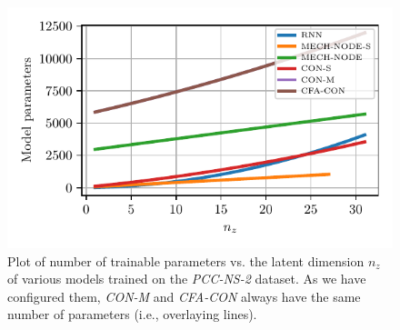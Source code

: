 \begin{figure}
    \centering
    \includegraphics[width=0.6\columnwidth]{con/figures/results/latent_dynamics/pcc_ns-2/sweep_num_trainable_params_vs_n_z.pdf}
    \caption{Plot of number of trainable parameters vs. the latent dimension $n_z$ of various models trained on the \emph{PCC-NS-2} dataset. As we have configured them, \emph{CON-M} and \emph{CFA-CON} always have the same number of parameters (i.e., overlaying lines).}
    \label{fig:apx-con:num_trainable_params_vs_n_z}
\end{figure}


